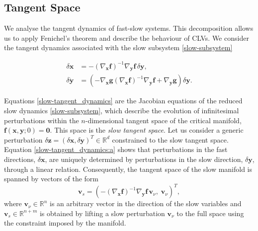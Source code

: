 \documentclass[aps,reprint,prx]{revtex4-2}
\begin{document}
\subsection{Tangent Space} \label{subsection: tangent space}

We analyse the tangent dynamics of fast-slow systems. This decomposition allows us to apply Fenichel's theorem and describe the behaviour of CLVs. We consider the tangent dynamics associated with the slow subsystem \eqref{slow-subsystem}

\begin{subequations} \label{slow-tangent_dynamics}
\begin{align}
    \delta \mathbf{x} &= -(\nabla_{\mathbf{x}}\mathbf{f})^{-1}\nabla_{\mathbf{y}}\mathbf{f}\,\delta\mathbf{y}, \label{slow-tangent_dynamics:a} \\
    \delta\dot{\mathbf{y}} &= \left(-\nabla_{\mathbf{x}}\mathbf{g}(\nabla_{\mathbf{x}}\mathbf{f})^{-1}\nabla_{\mathbf{y}}\mathbf{f}
    + \nabla_\mathbf{y}\mathbf{g}\right)\delta\mathbf{y}. \label{slow-tangent_dynamics:b}
\end{align}
\end{subequations}

Equations \eqref{slow-tangent_dynamics} are the Jacobian equations of the reduced slow dynamics \eqref{slow-subsystem}, which describe the evolution of infinitesimal perturbations within the $n$-dimensional tangent space of the critical manifold, $\mathbf{f}(\mathbf{x},\mathbf{y};0)=\mathbf{0}$. This space is the \emph{slow tangent space}. Let us consider a generic perturbation $\delta \mathbf{z} = \left(\delta \mathbf{x}, \delta \mathbf{y} \right)^T \in \mathbb{R}^d$ constrained to the slow tangent space. Equation \eqref{slow-tangent_dynamics:a} shows that perturbations in the fast directions, {$\delta \mathbf{x}$}, are {uniquely determined by perturbations in the slow direction, $\delta \mathbf{y}$,} through a linear relation. {Consequently, the {tangent space of the slow manifold} is spanned by vectors of the form
\begin{equation} \label{slow_eogenspace}
\mathbf{v}_{s}
=
\left(
- (\nabla_\mathbf{x}\mathbf{f})^{-1}\nabla_\mathbf{y}\mathbf{f}\,\mathbf{v}_{\nu},
\;
\mathbf{v}_{\nu}
\right)^{\!T},
\end{equation}
{where {$\mathbf{v}_{\nu} \in \mathbb{R}^n$} is an arbitrary vector in the direction of the slow variables and $\mathbf{v}_s \in \mathbb{R}^{n+m}$ is obtained by lifting a slow perturbation $\mathbf{v}_{\nu}$ to the full space using the constraint imposed by the manifold.}}
\end{document}
